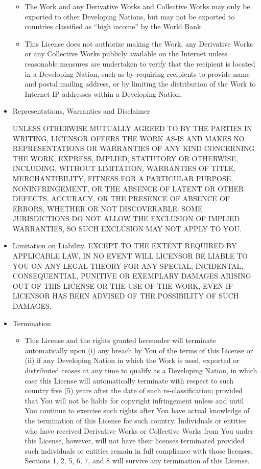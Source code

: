 \begin{itemize}
\begin{itemize}
\item The Work and any Derivative Works and Collective Works may only
be exported to other Developing Nations, but may not be exported to
countries classified as ``high income'' by the World Bank.

\item This License does not authorize making the Work, any Derivative
Works or any Collective Works publicly available on the Internet
unless reasonable measures are undertaken to verify that the recipient
is located in a Developing Nation, such as by requiring recipients to
provide name and postal mailing address, or by limiting the
distribution of the Work to Internet IP addresses within a Developing
Nation.\end{itemize}

\item Representations, Warranties and Disclaimer

UNLESS OTHERWISE MUTUALLY AGREED TO BY THE PARTIES IN WRITING,
LICENSOR OFFERS THE WORK AS-IS AND MAKES NO REPRESENTATIONS OR
WARRANTIES OF ANY KIND CONCERNING THE WORK, EXPRESS, IMPLIED,
STATUTORY OR OTHERWISE, INCLUDING, WITHOUT LIMITATION, WARRANTIES OF
TITLE, MERCHANTIBILITY, FITNESS FOR A PARTICULAR PURPOSE,
NONINFRINGEMENT, OR THE ABSENCE OF LATENT OR OTHER DEFECTS, ACCURACY,
OR THE PRESENCE OF ABSENCE OF ERRORS, WHETHER OR NOT DISCOVERABLE. 
SOME JURISDICTIONS DO NOT ALLOW THE EXCLUSION OF IMPLIED WARRANTIES,
SO SUCH EXCLUSION MAY NOT APPLY TO YOU.

\item Limitation on Liability.  EXCEPT TO THE EXTENT REQUIRED BY
APPLICABLE LAW, IN NO EVENT WILL LICENSOR BE LIABLE TO YOU ON ANY
LEGAL THEORY FOR ANY SPECIAL, INCIDENTAL, CONSEQUENTIAL, PUNITIVE OR
EXEMPLARY DAMAGES ARISING OUT OF THIS LICENSE OR THE USE OF THE WORK,
EVEN IF LICENSOR HAS BEEN ADVISED OF THE POSSIBILITY OF SUCH DAMAGES.

\item Termination \begin{itemize} \item This License and the rights
granted hereunder will terminate automatically upon (i) any breach by
You of the terms of this License or (ii) if any Developing Nation in
which the Work is used, exported or distributed ceases at any time to
qualify as a Developing Nation, in which case this License will
automatically terminate with respect to such country five (5) years
after the date of such re-classification; provided that You will not
be liable for copyright infringement unless and until You continue to
exercise such rights after You have actual knowledge of the
termination of this License for such country.  Individuals or entities
who have received Derivative Works or Collective Works from You under
this License, however, will not have their licenses terminated
provided such individuals or entities remain in full compliance with
those licenses.  Sections 1, 2, 5, 6, 7, and 8 will survive any
termination of this License.


\end{itemize}
\end{itemize}
